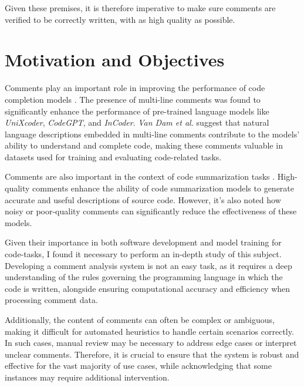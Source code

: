 \noindent Given these premises, it is therefore imperative to make sure comments are verified to be correctly written, with as high quality as possible.


\section{Motivation and Objectives}
Comments play an important role in improving the performance of code completion models \cite{vandam2023}.
The presence of multi-line comments was found to significantly enhance the performance of pre-trained language models like \textit{UniXcoder}, \textit{CodeGPT}, and \textit{InCoder}. \textit{Van Dam et al.} suggest that natural language descriptions embedded in multi-line comments contribute to the models' ability to understand and complete code, making these comments valuable in datasets used for training and evaluating code-related tasks.

\noindent Comments are also important in the context of code summarization tasks \cite{buildingRock}.
High-quality comments enhance the ability of code summarization models to generate accurate and useful descriptions of source code. However, it's also noted how noisy or poor-quality comments can significantly reduce the effectiveness of these models.

\noindent Given their importance in both software development and model training for code-tasks, I found it necessary to perform an in-depth study of this subject. Developing a comment analysis system \cite{commentAnalysis} is not an easy task, as it requires a deep understanding of the rules governing the programming language in which the code is written, alongside ensuring computational accuracy and efficiency when processing comment data.

\noindent Additionally, the content of comments can often be complex or ambiguous, making it difficult for automated heuristics to handle certain scenarios correctly. In such cases, manual review may be necessary to address edge cases or interpret unclear comments.
Therefore, it is crucial to ensure that the system is robust and effective for the vast majority of use cases, while acknowledging that some instances may require additional intervention.

